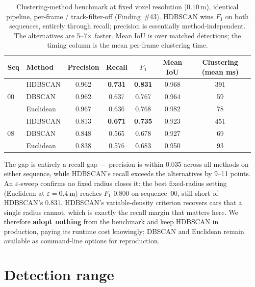 \begin{table}[H]
  \centering
  \caption{Clustering-method benchmark at fixed voxel resolution
    ($\SI{0.10}{\metre}$), identical pipeline, per-frame / track-filter-off
    (Finding~\#43). HDBSCAN wins $F_1$ on both sequences, entirely through
    recall; precision is essentially method-independent. The alternatives are
    5--7$\times$ faster. Mean IoU is over matched detections; the timing column is
    the mean per-frame clustering time.}
  \label{tab:clustering}
  \begin{tabular}{llccccc}
    \toprule
    Seq & Method & Precision & Recall & $F_1$ & Mean IoU & Clustering (mean ms) \\
    \midrule
    \multirow{3}{*}{00}
      & HDBSCAN   & 0.962 & \textbf{0.731} & \textbf{0.831} & 0.968 & 391 \\
      & DBSCAN    & 0.962 & 0.637 & 0.767 & 0.964 & 59 \\
      & Euclidean & 0.967 & 0.636 & 0.768 & 0.982 & 78 \\
    \midrule
    \multirow{3}{*}{08}
      & HDBSCAN   & 0.813 & \textbf{0.671} & \textbf{0.735} & 0.923 & 451 \\
      & DBSCAN    & 0.848 & 0.565 & 0.678 & 0.927 & 69 \\
      & Euclidean & 0.838 & 0.576 & 0.683 & 0.950 & 93 \\
    \bottomrule
  \end{tabular}
\end{table}

The gap is entirely a recall gap --- precision is within \num{0.035} across all
methods on either sequence, while HDBSCAN's recall exceeds the alternatives by
\numrange{9}{11} points. An $\varepsilon$-sweep confirms no fixed radius closes
it: the best fixed-radius setting (Euclidean at $\varepsilon=\SI{0.4}{\metre}$)
reaches $F_1$ \num{0.800} on sequence~00, still short of HDBSCAN's \num{0.831}.
HDBSCAN's variable-density criterion recovers cars that a single radius cannot,
which is exactly the recall margin that matters here. We therefore
\textbf{adopt nothing} from the benchmark and keep HDBSCAN in production, paying
its runtime cost knowingly; DBSCAN and Euclidean remain available as
command-line options for reproduction.

\section{Detection range}
\label{sec:results-distance}

